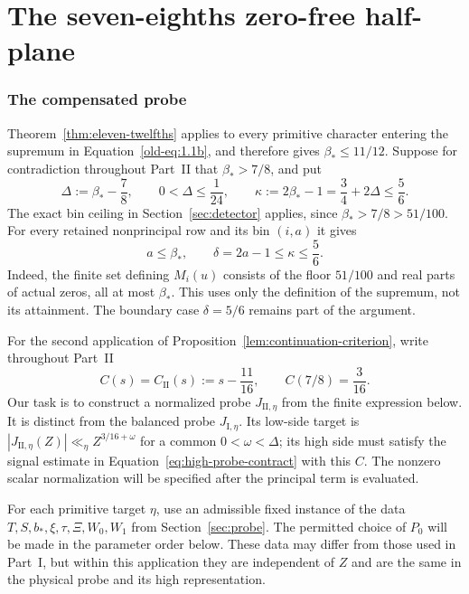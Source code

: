 \part{The seven-eighths zero-free half-plane}
\label{part:seven-eighths}

\section{The compensated probe}\label{sec:compensation}

Theorem~\ref{thm:eleven-twelfths} applies to every primitive character
entering the supremum in Equation~\eqref{old-eq:1.1b}, and therefore gives
$\beta_*\le11/12$.  Suppose for contradiction throughout Part~II that
$\beta_*>7/8$, and put
\begin{equation}\label{eq:part-II-bootstrap}
 \Delta:=\beta_*-\frac78,\qquad 0<\Delta\le\frac1{24},
 \qquad
 \kappa:=2\beta_*-1=\frac34+2\Delta\le\frac56.
\end{equation}
The exact bin ceiling in Section~\ref{sec:detector} applies, since
$\beta_*>7/8>51/100$.  For every retained nonprincipal row and its bin
$(i,a)$ it gives
\begin{equation}\label{eq:part-II-bin-ceiling}
 a\le\beta_*,\qquad \delta=2a-1\le\kappa\le\frac56.
\end{equation}
Indeed, the finite set defining $M_i(u)$ consists of the floor $51/100$ and
real parts of actual zeros, all at most $\beta_*$.  This uses only the
definition of the supremum, not its attainment.  The boundary case
$\delta=5/6$ remains part of the argument.

For the second application of Proposition~\ref{lem:continuation-criterion},
write throughout Part~II
\begin{equation}\label{eq:part-II-mellin-target}
 C(s)=C_{\mathrm{II}}(s):=s-\frac{11}{16},\qquad
 C(7/8)=\frac3{16}.
\end{equation}
Our task is to construct a normalized probe $J_{\mathrm{II},\eta}$ from
the finite expression below.  It is distinct from the balanced probe
$J_{\mathrm I,\eta}$.  Its low-side target is
$|J_{\mathrm{II},\eta}(Z)|\ll_\eta Z^{3/16+\omega}$ for a common
$0<\omega<\Delta$; its high side must satisfy the signal estimate in
Equation~\eqref{eq:high-probe-contract} with this $C$.  The nonzero scalar
normalization will be specified after the principal term is evaluated.

For each primitive target $\eta$, use an admissible fixed instance of the
data $T,S,b_*,\xi,\tau,\Xi,W_0,W_1$ from Section~\ref{sec:probe}.  The
permitted choice of $P_0$ will be made in the parameter order below.  These
data may differ from those used in Part~I, but within this application they
are independent of $Z$ and are the same in the physical probe and its high
representation.

